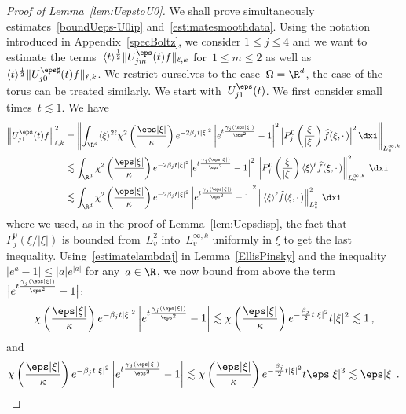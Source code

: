 \begin{proof}[Proof of Lemma~\ref{lem:UepstoU0}]
We shall prove simultaneously estimates~\eqref{boundUeps-U0ip} and~\eqref{estimatesmoothdata}. Using the notation introduced in Appendix~\ref{specBoltz}, we consider $1 \le j \le 4$ and we want to estimate the terms~$\langle t \rangle^{\frac12}\|U^\eps_{jm}(t)f\|_{\ell,k}$ for~$1 \le m \le 2$ as well as~$\langle t \rangle^{\frac 12}\|U^{\eps\sharp}_{j0}(t)f\|_{\ell,k}$. We restrict ourselves to the case~$\Omega = \R^d$, the case of the torus can be treated similarly. We start with~$U^\eps_{j1}(t)$. We first consider small times~$t \lesssim 1$. We have
\begin{align*}
\left\|U^\eps_{j1} (t)f\right\|_{\ell,k}^2
&= \left \| \int_{\R^d} \langle \xi \rangle^{2\ell} \chi^2\left(\frac{\eps|\xi|}{\kappa}\right) e^{- 2\beta_j t |\xi|^2} \left|e^{t \frac{\gamma_j(\eps|\xi|)}{\eps^2}}-1 \right|^2\Big|P_{j}^0\left(\frac{\xi}{|\xi|}\right)\widehat{f}(\xi,\cdot\,)\Big|^2 \, \dxi\right \|_{L^{\infty,k}_v} \\
&\lesssim \int_{\R^d} \chi^2\left(\frac{\eps|\xi|}{\kappa}\right) e^{- 2\beta_j t |\xi|^2} \Big|e^{t \frac{\gamma_j(\eps|\xi|)}{\eps^2}}-1 \Big|^2\left\|P_{j}^0\left(\frac{\xi}{|\xi|}\right)\langle \xi \rangle^\ell \widehat{f}(\xi,\cdot\,)\right\|^2_{L^{\infty,k}_v} \, \dxi\\
&\lesssim \int_{\R^d} \chi^2\left(\frac{\eps|\xi|}{\kappa}\right) e^{- 2\beta_j t |\xi|^2} \left|e^{t \frac{\gamma_j(\eps|\xi|)}{\eps^2}}-1 \right|^2\left\|\langle \xi \rangle^\ell \widehat{f}(\xi,\cdot\,)\right\|^2_{L^{2}_v} \, \dxi
\end{align*}
where we used, as in the proof of Lemma~\ref{lem:Uepsdisp}, the fact that $P_{j}^0(\xi/|\xi|)$ is bounded from~$L^2_v$ into~$L^{\infty,k}_v$ uniformly in $\xi$ to get the last inequality. Using~\eqref{estimatelambdaj} in Lemma~\ref{EllisPinsky} and the inequality $|e^a-1| \le |a| e^{|a|}$ for any~$a \in \R$, we now bound from above the term~$\big|e^{t \frac{\gamma_j(\eps|\xi|)}{\eps^2}}-1 \big|$:
\begin{equation}\label{estimategamma1}
\chi \left(\frac{\eps|\xi|}\kappa\right) e^{- \beta_j t |\xi|^2} \left|e^{t \frac{\gamma_j(\eps|\xi|)}{\eps^2}}-1 \right| \lesssim \chi\left (\frac{\eps|\xi|}\kappa\right) e^{- \frac{\beta_j }2 t |\xi|^2} t |\xi|^2 \lesssim 1\,,
\end{equation}
and
\begin{equation}\label{estimategamma2}
\chi\left(\frac{\eps|\xi|}\kappa\right) e^{- \beta_j t |\xi|^2} \left|e^{t \frac{\gamma_j(\eps|\xi|)}{\eps^2}}-1 \right| \lesssim \chi\left (\frac{\eps|\xi|}\kappa\right) e^{- \frac{\beta_j }2 t |\xi|^2} t \eps |\xi|^3 \lesssim \eps |\xi| \,.

\end{equation}
\end{proof}
